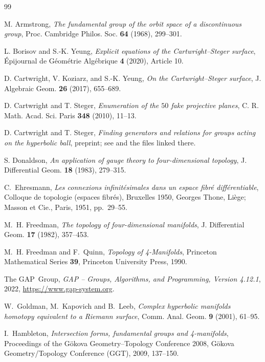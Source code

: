 \documentclass[11pt]{amsart}
\theoremstyle{definition}
\theoremstyle{remark}
\begin{document}
\begin{thebibliography}{99}

M. Armstrong,
\emph{The fundamental group of the orbit space of a discontinuous group},
Proc. Cambridge Philos. Soc. \textbf{64} (1968), 299--301.

L. Borisov and S.-K. Yeung,
\emph{Explicit equations of the Cartwright--Steger surface},
\'Epijournal de G\'eom\'etrie Alg\'ebrique \textbf{4} (2020), Article 10.

D. Cartwright, V. Koziarz, and S.-K. Yeung,
\emph{On the Cartwright--Steger surface},
J. Algebraic Geom. \textbf{26} (2017), 655--689.

D. Cartwright and T. Steger,
\emph{Enumeration of the $50$ fake projective planes},
C. R. Math. Acad. Sci. Paris \textbf{348} (2010), 11--13.

D. Cartwright and T. Steger,
\emph{Finding generators and relations for groups acting on the hyperbolic
ball}, preprint; see \cite{CKY} and the files linked there.

S. Donaldson,
\emph{An application of gauge theory to four-dimensional topology},
J. Differential Geom. \textbf{18} (1983), 279--315.

C.~Ehresmann,
\emph{Les connexions infinit\'esimales dans un espace fibr\'e diff\'erentiable},
Colloque de topologie (espaces fibr\'es), Bruxelles 1950,
Georges Thone, Li\`ege; Masson et Cie., Paris, 1951, pp.~29--55.

M.~H. Freedman,
\emph{The topology of four-dimensional manifolds},
J. Differential Geom. \textbf{17} (1982), 357--453.

M.~H. Freedman and F.~Quinn,
\emph{Topology of 4-Manifolds},
Princeton Mathematical Series \textbf{39}, Princeton University Press, 1990.

The GAP~Group,
\emph{GAP -- Groups, Algorithms, and Programming, Version 4.12.1}, 2022,
\url{https://www.gap-system.org}.

W.~Goldman, M.~Kapovich and B.~Leeb,
\emph{Complex hyperbolic manifolds homotopy equivalent to a
              {R}iemann surface},
Comm. Anal. Geom. \textbf{9} (2001), 61--95.

I.~Hambleton,
\emph{Intersection forms, fundamental groups and 4-manifolds},
Proceedings of the G\"okova Geometry--Topology Conference 2008,
G\"okova Geometry/Topology Conference (GGT), 2009, 137--150.


\end{thebibliography}
\end{document}
